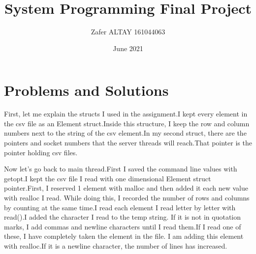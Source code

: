 \documentclass{article}
\title{System Programming Final Project}
\author{Zafer ALTAY 161044063 }
\date{June 2021}
\begin{document}
\maketitle

\section{Problems and Solutions}

First, let me explain the structs I used in the assignment.I kept every element in the csv file as an Element struct.Inside this structure, I keep the row and column numbers next to the string of the csv element.In my second struct, there are the pointers and socket numbers that the server threads will reach.That pointer is the pointer holding csv files.

Now let's go back to main thread.First I saved the command line values with getopt.I kept the csv file I read with one dimensional Element struct pointer.First, I reserved 1 element with malloc and then added it each new value with realloc I read. While doing this, I recorded the number of rows and columns by counting at the same time.I read each element I read letter by letter with read().I added the character I read to the temp string. If it is not in quotation marks, I add commas and newline characters until I read them.If I read one of these, I have completely taken the element in the file. I am adding this element with realloc.If it is a newline character, the number of lines has increased.
\end{document}
